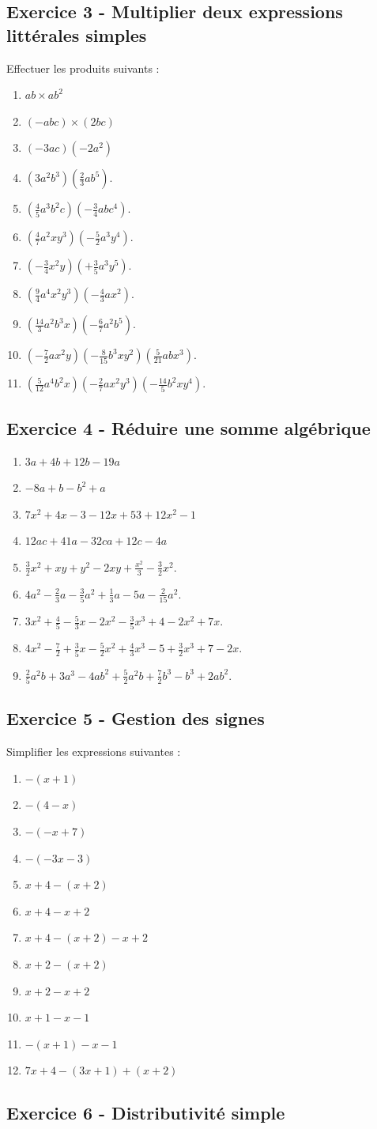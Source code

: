 \documentclass[14 pt]{extarticle}
\renewcommand\it\item
\theoremstyle{plain}
\begin{document}
  \subsection*{Exercice 3 - Multiplier deux expressions littérales simples}
  Effectuer les produits suivants : 
\begin{enumerate}
\it $ab \times ab^2$
\it $(-abc) \times (2bc)$
\it $(-3ac)(-2a^2)$
\it $(3a^2b^3)\left(\frac23ab^5\right)$.
\it $\left(\frac45a^3b^2c\right)\left(-\frac34abc^4\right)$. 
\it $\left(\frac47a^2xy^3\right)\left(-\frac52a^3y^4\right)$.
\it $\left(-\frac34x^2y\right)\left(+\frac35a^3y^5\right)$.
\it $\left(\frac94a^4x^2y^3\right)\left(-\frac43ax^2\right)$. 
\it $\left(\frac{14}3a^2b^3x\right)\left(-\frac67a^2b^5\right)$. 
\it $\left(-\frac72ax^2y\right)\left(-\frac8{15}b^3xy^2\right)\left(\frac5{21}abx^3\right)$.
\it $\left(\frac5{12}a^4b^2x\right)\left(-\frac27ax^2y^3\right)\left(-\frac{14}5b^2xy^4\right)$. 
\end{enumerate}
  
  \subsection*{Exercice 4 - Réduire une somme algébrique}
  
\begin{enumerate}
\it $3a + 4b + 12b -19a$
\it $-8a + b - b^2 + a$
\it $7x^2 + 4x - 3 - 12x + 53 + 12x^2 - 1$
\it $12ac + 41a - 32 ca + 12 c - 4 a$
\it $\frac32 x^2+xy+y^2-2xy+\frac{x^2}3-\frac32x^2$.
\it $4a^2-\frac23a-\frac35a^2+\frac13a-5a-\frac2{15}a^2$.
\it $3x^2+\frac45 - \frac53x - 2x^2 -\frac35x^3 + 4 - 2 x^2 + 7x$. 
\it $4x^2 - \frac72 + \frac35x - \frac52x^2 + \frac43 x^3 - 5 + \frac32 x^3 + 7 - 2x$. 
\it $\frac25 a^2b + 3a^3 -4ab^2 + \frac52 a^2b + \frac72b^3 - b^3 + 2ab^2$. 
\end{enumerate}
  
  
  \subsection*{Exercice 5 - Gestion des signes}
 Simplifier les expressions suivantes : 
  \begin{enumerate}
  \it $-(x+1)$ 
  \it $-(4-x)$
  \it $-(-x+7)$
  \it $-(-3x-3)$
  \it $x+4 - (x+2)$
  \it $x+4 - x+2$
  \it $x+4 - (x+2) - x + 2$
  \it $x+2-(x+2)$ 
  \it $x+2-x+2$
  \it $x+1 - x - 1 $
  \it $-(x+1) - x - 1$ 
  \it $7x+4- (3x+1) + (x+2)$
  \end{enumerate}
  
  
  \subsection*{Exercice 6 - Distributivité simple}
  
\end{document}
